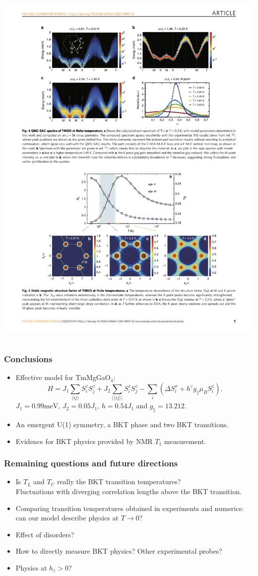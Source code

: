 \documentclass[xcolor=table, aspectratio=1610,ignorenonframetext]{beamer}
\begin{document}
\begin{frame}
\begin{columns}
\begin{itemize}
      \includegraphics[width=.8\textwidth]{spinwave-fit1}
    \end{itemize}
  \end{columns}
\end{frame}

\begin{frame}
  \frametitle{Conclusions}
  \begin{itemize}
    \item Effective model for TmMgGaO${}_4$:
    \[H = J_1\sum_{\langle ij\rangle}S_i^zS_j^z +J_2\sum_{\langle\langle ij\rangle\rangle}S_i^zS_j^z - \sum_i\left(\Delta S_i^x + h^zg_\parallel\mu_BS_i^z\right). \]
    $J_1 = 0.99 \text{meV}$, $J_2 = 0.05J_1$,  $h= 0.54J_1$ and $g_\parallel = 13.212$.
    \item An emergent U(1) symmetry, a BKT phase and two BKT transitions.
    \item Evidence for BKT physics provided by NMR $T_1$ measurement.
  \end{itemize}
\end{frame}

\begin{frame}
  \frametitle{Remaining questions and future directions}
  \begin{itemize}
    \item Is $T_L$ and $T_U$ really the BKT transition temperatures?\\
    Fluctuations with diverging correlation lengths above the BKT transition.
    \item Comparing transition temperatures obtained in experiments and numerics: can our model describe physics at $T\rightarrow0$?
    \item Effect of disorders?
    \item How to directly measure BKT physics? Other experimental probes?
    \item Physics at $h_z>0$?
  \end{itemize}
\end{frame}
\end{document}

